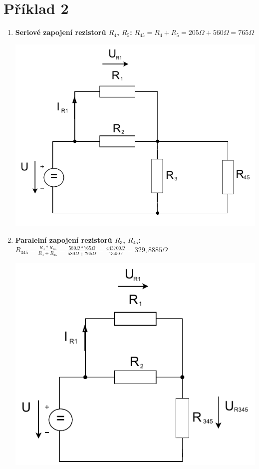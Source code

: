 \section{Příklad 2}

\begin{enumerate}
    \item \textbf{Seriové zapojení rezistorů $R_4$, $R_5$:} \newline
    $R_{45} = R_4 + R_5 = 205\Omega + 560\Omega = 765\Omega$
    
    \includegraphics[scale=0.7]{pr2/pr2.1.pdf}
    
    \item \textbf{Paralelní zapojení rezistorů $R_3$, $R_{45}$:} \newline
    $R_{345} = \frac{R_3 * R_{45}}{R_3 + R_{45}} = \frac{580\Omega * 765\Omega}{580\Omega + 765\Omega} = \frac{443700\Omega}{1345\Omega} = 329,8885\Omega$
    
    \includegraphics[scale=0.7]{pr2/pr2.2.pdf}
    

\end{enumerate}
